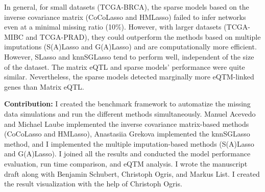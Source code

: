 \begin{enumerate}
In general, for small datasets (TCGA-BRCA), the sparse models based on the inverse covariance matrix (CoCoLasso and HMLasso) failed to infer networks even at a minimal missing ratio (10\%). However, with larger datasets (TCGA-MIBC and TCGA-PRAD), they could outperform the methods based on multiple imputations (S(A)Lasso and G(A)Lasso) and are computationally more efficient. However, SLasso and knnSGLasso tend to perform well, independent of the size of the dataset. The matrix eQTL and sparse models' performance were quite similar. Nevertheless, the sparse models detected marginally more eQTM-linked genes than Matrix eQTL.

	\textbf{Contribution:} I created the benchmark framework to automatize the missing data simulations and run the different methods simultaneously. Manuel Acevedo and Michael Laube implemented the inverse covariance matrix-based methods (CoCoLasso and HMLasso), Anastasiia Grekova implemented the knnSGLasso method, and I implemented the multiple imputation-based methods (S(A)Lasso and G(A)Lasso). I joined all the results and conducted the model performance evaluation, run time comparison, and eQTM analysis. I wrote the manuscript draft along with Benjamin Schubert, Christoph Ogris, and Markus List. I created the result visualization with the help of Christoph Ogris.

\end{enumerate}
